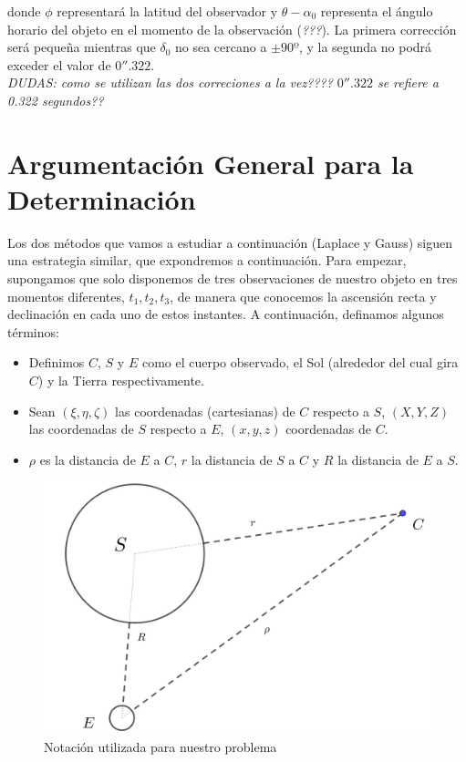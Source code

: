 \documentclass[11pt]{article}
\begin{document}
\noindent donde $\phi$ representará la latitud del observador y $\theta-\alpha_0$ representa el ángulo horario del objeto en el momento de la observación (\textit{???}). La primera corrección será pequeña mientras que $\delta_0$ no sea cercano a $\pm90º$, y la segunda no podrá exceder el valor de $0''.322$.\\

\textit{DUDAS: como se utilizan las dos correciones a la vez???? $0''.322$ se refiere a 0.322 segundos??}\\


\section{Argumentación General para la Determinación}
Los dos métodos que vamos a estudiar a continuación (Laplace y Gauss) siguen una estrategia similar, que expondremos a continuación. Para empezar, supongamos que solo disponemos de tres observaciones de nuestro objeto en tres momentos diferentes, $t_1, t_2, t_3$, de manera que conocemos la ascensión recta y declinación en cada uno de estos instantes. A continuación, definamos algunos términos:
\begin{itemize}
\item Definimos $C$, $S$ y $E$ como el cuerpo observado, el Sol (alrededor del cual gira $C$) y la Tierra respectivamente.
\item Sean $(\xi,\eta,\zeta)$ las coordenadas (cartesianas) de $C$ respecto a $S$, $(X,Y,Z)$ las coordenadas de $S$ respecto a $E$, $(x,y,z)$ coordenadas de $C$.
\item $\rho$ es la distancia de $E$ a $C$, $r$ la distancia de $S$ a $C$ y $R$ la distancia de $E$ a $S$.
\end{itemize}

\begin{figure}[H]
\centering
\includegraphics[scale=0.15]{images/notation.png}
\caption{Notación utilizada para nuestro problema}
\label{fig:notation}
\end{figure}
\end{document}
